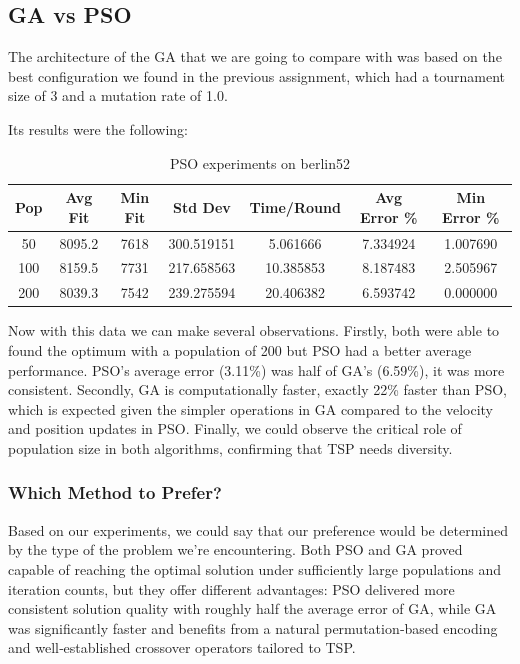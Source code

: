 \documentclass[12pt,a4paper]{article}
\begin{document}
\subsection{GA vs PSO}
The architecture of the GA that we are going to compare with was based on the best configuration we found in the previous assignment, which had a tournament size of 3 and a mutation rate of 1.0.

Its results were the following:
\begin{table}[H]
\centering
\begin{tabular}{c c c c c c c}
\hline
\textbf{Pop} & \textbf{Avg Fit} & \textbf{Min Fit} & \textbf{Std Dev} & \textbf{Time/Round} & \textbf{Avg Error \%} & \textbf{Min Error \%} \\
\hline
   50  & 8095.2 &  7618 & 300.519151 & 5.061666 & 7.334924 & 1.007690 \\
  100 & 8159.5 &  7731 & 217.658563 & 10.385853 & 8.187483 & 2.505967 \\
 200 & 8039.3 &  7542 & 239.275594 & 20.406382 & 6.593742 & 0.000000 \\
\hline
\end{tabular}
\caption{PSO experiments on berlin52}
\end{table}

Now with this data we can make several observations. Firstly, both were able to found the optimum with a population
of 200 but PSO had a better average performance. PSO's average error (3.11\%) 
was half of GA's (6.59\%), it was more consistent.
Secondly, GA is computationally faster, exactly 22\% faster 
than PSO, which is expected given the simpler operations in GA compared to the velocity and position updates in PSO.
Finally, we could observe the critical role of population size in both algorithms, confirming that TSP needs diversity.

\subsubsection{Which Method to Prefer?}

Based on our experiments, we could say that our preference would be determined by the type of the problem we're encountering.
Both PSO and GA proved capable of reaching the optimal solution under sufficiently large populations and iteration counts, but they offer different advantages:
 PSO delivered more consistent solution quality with roughly half the average error of GA, 
 while GA was significantly faster and benefits from a natural permutation‑based encoding and well‑established crossover operators tailored to TSP.
\end{document}
